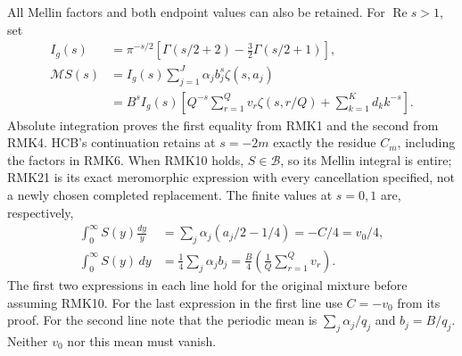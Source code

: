 All Mellin factors and both endpoint values can also be retained.
For $\operatorname{Re}s>1$, set
\begin{equation}\tag{RMK21}
\begin{split}
 I_g(s)&=\pi^{-s/2}
       [\Gamma(s/2+2)-\tfrac32\Gamma(s/2+1)],\\
 \mathcal M S(s)
 &=I_g(s)\sum_{j=1}^J\alpha_j b_j^s\zeta(s,a_j)\\
 &=B^sI_g(s)\left[
       Q^{-s}\sum_{r=1}^Qv_r\zeta(s,r/Q)
       +\sum_{k=1}^K d_k k^{-s}\right].
\end{split}
\end{equation}
Absolute integration proves the first equality from RMK1 and the
second from RMK4. HCB's continuation retains at $s=-2m$ exactly
the residue $C_m$, including the factors in RMK6. When RMK10
holds, $S\in\mathcal B$, so its Mellin integral is entire; RMK21
is its exact meromorphic expression with every cancellation
specified, not a newly chosen completed replacement. The finite
values at $s=0,1$ are, respectively,
\begin{equation}\tag{RMK22}
\begin{split}
 \int_0^\infty S(y)\frac{dy}{y}
    &=\sum_j\alpha_j(a_j/2-1/4)=-C/4=v_0/4,\\
 \int_0^\infty S(y)\,dy
    &=\tfrac14\sum_j\alpha_jb_j
      =\frac B4\left(\frac1Q\sum_{r=1}^Qv_r\right).
\end{split}
\end{equation}
The first two expressions in each line hold for the original
mixture before assuming RMK10. For the last expression in the
first line use $C=-v_0$ from its proof. For the second line note
that the periodic mean is $\sum_j\alpha_j/q_j$ and
$b_j=B/q_j$. Neither $v_0$ nor this mean must vanish.

